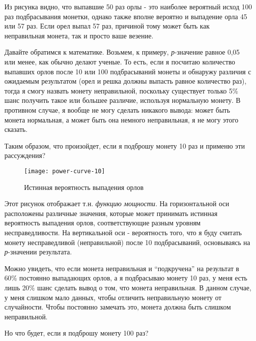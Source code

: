 Из рисунка видно, что выпавшие 50 раз орлы - это наиболее вероятный исход 100 раз подбрасывания монетки, однако также вполне вероятно и выпадение орла 45 или 57 раз. Если орел выпал 57 раз, причиной тому может быть как неправильная монета, так и просто ваше везение.  

Давайте обратимся к математике. Возьмем, к примеру, \emph{р}-значение равное 0,05 или менее, как обычно делают ученые. То есть, если я посчитаю количество выпавших орлов после 10 или 100 подбрасываний монеты и обнаружу различия с ожидаемым результатом (орел и решка должны выпасть равное количество раз), тогда я смогу назвать монету неправильной, поскольку существует только 5\% шанс получить такое или большее различие, используя нормальную монету. В противном случае, я вообще не могу сделать никакого вывода: может быть монета нормальная, а может быть она немного неправильная, я не могу этого сказать.

Таким образом, что произойдет, если я подброшу монету 10 раз и применю эти рассуждения?


\newpage %

\begin{figure}[h!]
    \centering
    \texttt{[image: power-curve-10]}
    \caption{Истинная вероятность выпадения орлов}
    \label{fig3:powercurve10}
\end{figure}

Этот рисунок отображает т.н. \emph{функцию мощности}. На горизонтальной оси расположены различные значения, которые может принимать истинная вероятность выпадения орлов, соответствующие разным уровням несправедливости. На вертикальной оси - вероятность того, что я буду считать монету несправедливой (неправильной) после 10 подбрасываний, основываясь на \emph{р}-значении результата.

Можно увидеть, что если монета неправильная и ``подкручена'' на результат в 60\% постоянно выпадающих орлов, а я подбрасываю монету 10 раз, у меня есть лишь 20\% шанс сделать вывод о том, что монета неправильная. В данном случае, у меня слишком мало данных, чтобы отличить неправильную монету от случайности. Чтобы постоянно замечать это, монета должна быть слишком неправильной.

Но что будет, если я подброшу монету 100 раз?

\newpage %

